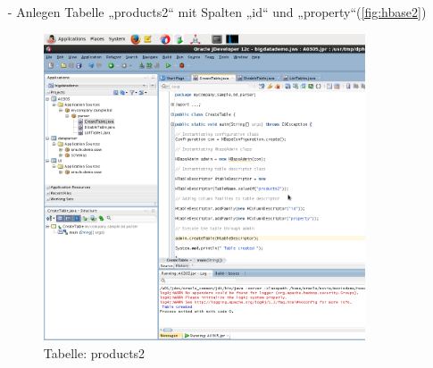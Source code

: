 \begin{itemize}
\item[-] Anlegen Tabelle „products2“ mit Spalten „id“ und „property“(\autoref{fig:hbase2})
\begin{figure}[!htb]
        \begin{minipage}{1\textwidth}
                \centering
                \includegraphics[width=0.90\textwidth]{pics/hbase2.png}\par\vspace{0cm}
                \caption{Tabelle: products2}
                \label{fig:hbase2}
        \end{minipage}
\end{figure}


\end{itemize}
